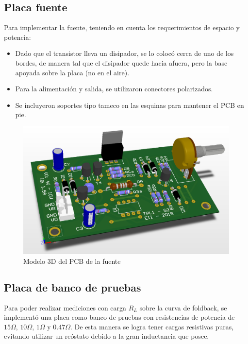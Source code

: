 \subsection{Placa fuente}

Para implementar la fuente, teniendo en cuenta los requerimientos de espacio y potencia:

\begin{itemize}
\item Dado que el transistor lleva un disipador, se lo coloc\'o cerca de uno de los bordes, de manera tal que el disipador quede hacia afuera, pero la base apoyada sobre la placa (no en el aire).
\item Para la alimentaci\'on y salida, se utilizaron conectores polarizados.
\item Se incluyeron soportes tipo tameco en las esquinas para mantener el PCB en pie.
\end{itemize}

\begin{figure}[!ht]
\begin{centering}
\includegraphics[scale=0.45]{Imagenes/Fuente3D.png}
\par\end{centering}
\caption{Modelo 3D del PCB de la fuente}

\end{figure}

\subsection{Placa de banco de pruebas}

Para poder realizar mediciones con carga $R_L$ sobre la curva de foldback, se implement\'o una placa como banco de pruebas con resistencias de potencia de $15\Omega$, $10\Omega$, $1\Omega$ y $0.47\Omega$. De esta manera se logra tener cargas resistivas puras, evitando utilizar un re\'ostato debido a la gran inductancia que posee.

